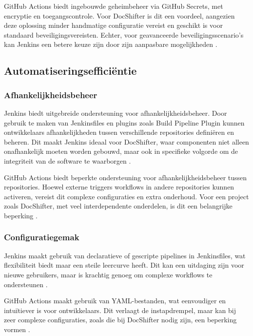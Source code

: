 GitHub Actions biedt ingebouwde geheimbeheer via GitHub Secrets, met encryptie en toegangscontrole. Voor DocShifter is dit een voordeel, aangezien deze oplossing minder handmatige configuratie vereist en geschikt is voor standaard beveiligingsvereisten. Echter, voor geavanceerde beveiligingsscenario's kan Jenkins een betere keuze zijn door zijn aanpasbare mogelijkheden \autocite{spacelift2023}.

\subsection{Automatiseringsefficiëntie}

\subsubsection{Afhankelijkheidsbeheer}

Jenkins biedt uitgebreide ondersteuning voor afhankelijkheidsbeheer. Door gebruik te maken van Jenkinsfiles en plugins zoals Build Pipeline Plugin kunnen ontwikkelaars afhankelijkheden tussen verschillende repositories definiëren en beheren. Dit maakt Jenkins ideaal voor DocShifter, waar componenten niet alleen onafhankelijk moeten worden gebouwd, maar ook in specifieke volgorde om de integriteit van de software te waarborgen \autocite{kulkarni2022}.

GitHub Actions biedt beperkte ondersteuning voor afhankelijkheidsbeheer tussen repositories. Hoewel externe triggers workflows in andere repositories kunnen activeren, vereist dit complexe configuraties en extra onderhoud. Voor een project zoals DocShifter, met veel interdependente onderdelen, is dit een belangrijke beperking \autocite{spacelift2023}.

\subsubsection{Configuratiegemak}

Jenkins maakt gebruik van declaratieve of gescripte pipelines in Jenkinsfiles, wat flexibiliteit biedt maar een steile leercurve heeft. Dit kan een uitdaging zijn voor nieuwe gebruikers, maar is krachtig genoeg om complexe workflows te ondersteunen \autocite{kulkarni2022}.

GitHub Actions maakt gebruik van YAML-bestanden, wat eenvoudiger en intuïtiever is voor ontwikkelaars. Dit verlaagt de instapdrempel, maar kan bij zeer complexe configuraties, zoals die bij DocShifter nodig zijn, een beperking vormen \autocite{spacelift2023}.

